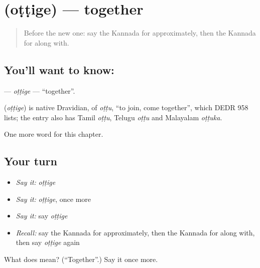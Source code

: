 \section[\texorpdfstring{\kn{ಒಟ್ಟಿಗೆ} (oṭṭige)}{ಒಟ್ಟಿಗೆ (oṭṭige)}]{ (oṭṭige) — together}

\label{lesson:KA-C252-ottige}



\begin{quote}
Before the new one: say the Kannada for approximately, then the Kannada for along with.
\end{quote}

\subsection*{You'll want to know: }
\textbf{} — \emph{oṭṭige} — \textquotedblleft{}together\textquotedblright{}.

\begin{cousinweb}
\textbf{} (\emph{oṭṭige}) is native Dravidian, of \emph{oṭṭu}, \textquotedblleft{}to join, come together\textquotedblright{}, which DEDR 958 lists; the entry also has Tamil \emph{oṭṭu}, Telugu \emph{oṭṭu} and Malayalam \emph{oṭṭuka}.
\end{cousinweb}

\begin{grammarlens}[title={What you've built}]
One more word for this chapter.
\end{grammarlens}

\subsection*{Your turn}
\begin{itemize}
\raggedright
  \item \emph{Say it:} \emph{oṭṭige}
  \item \emph{Say it:} \emph{oṭṭige}, once more
  \item \emph{Say it:} say \emph{oṭṭige}
  \item \emph{Recall:} say the Kannada for approximately, then the Kannada for along with, then say \emph{oṭṭige} again
\end{itemize}

\begin{tcolorbox}[breakable,colback=teal!4,colframe=teal!35!black,title={Before you move on}]
What does  mean? (\textquotedblleft{}Together\textquotedblright{}.) Say it once more.
\end{tcolorbox}
